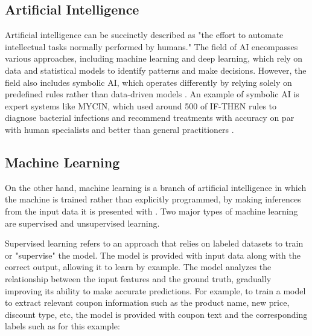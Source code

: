 \documentclass[licencjacka,en]{pracamgr}
\begin{document}
\subsection{Artificial Intelligence}
Artificial intelligence can be succinctly described as "the effort to automate intellectual tasks normally performed by humans." The field of AI encompasses various approaches, including machine learning and deep learning, which rely on data and statistical models to identify patterns and make decisions. However, the field also includes symbolic AI, which operates differently by relying solely on predefined rules rather than data-driven models \cite{francuz_2}. An example of symbolic AI is expert systems like MYCIN, which used around 500 of IF-THEN rules to diagnose bacterial infections and recommend treatments with accuracy on par with human specialists and better than general practitioners \cite{mycin}.

\subsection{Machine Learning}
On the other hand, machine learning is a branch of artificial intelligence in which the machine is trained rather than explicitly programmed, by making inferences from the input data it is presented with \cite{francuz_3}. Two major types of machine learning are supervised and unsupervised learning.

Supervised learning refers to an approach that relies on labeled datasets to train or "supervise" the model. The model is provided with input data along with the correct output, allowing it to learn by example. The model analyzes the relationship between the input features and the ground truth, gradually improving its ability to make accurate predictions. For example, to train a model to extract relevant coupon information such as the product name, new price, discount type, etc, the model is provided with coupon text and the corresponding labels such as for this example:
\end{document}
